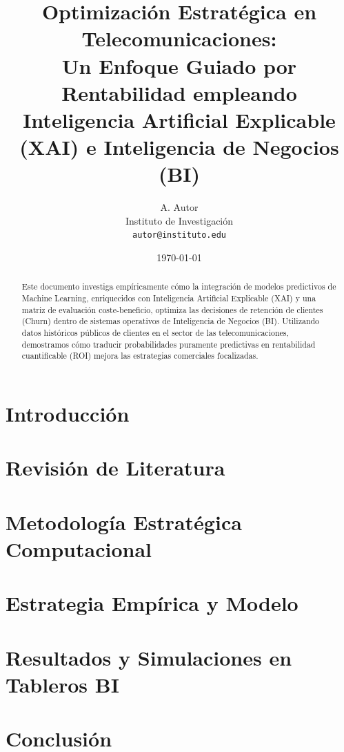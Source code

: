 \documentclass[11pt,a4paper]{article}
\title{Optimización Estratégica en Telecomunicaciones:\\ Un Enfoque Guiado por Rentabilidad empleando Inteligencia Artificial Explicable (XAI) e Inteligencia de Negocios (BI)}
\author{A. Autor \\ Instituto de Investigación \\ \texttt{autor@instituto.edu}}
\date{\today}
\begin{document}
\maketitle

\begin{abstract}
Este documento investiga empíricamente cómo la integración de modelos predictivos de Machine Learning, enriquecidos con Inteligencia Artificial Explicable (XAI) y una matriz de evaluación coste-beneficio, optimiza las decisiones de retención de clientes (Churn) dentro de sistemas operativos de Inteligencia de Negocios (BI). Utilizando datos históricos públicos de clientes en el sector de las telecomunicaciones, demostramos cómo traducir probabilidades puramente predictivas en rentabilidad cuantificable (ROI) mejora las estrategias comerciales focalizadas.
\end{abstract}

\section{Introducción}


\section{Revisión de Literatura}


\section{Metodología Estratégica Computacional}


\section{Estrategia Empírica y Modelo}


\section{Resultados y Simulaciones en Tableros BI}


\section{Conclusión}




\end{document}
